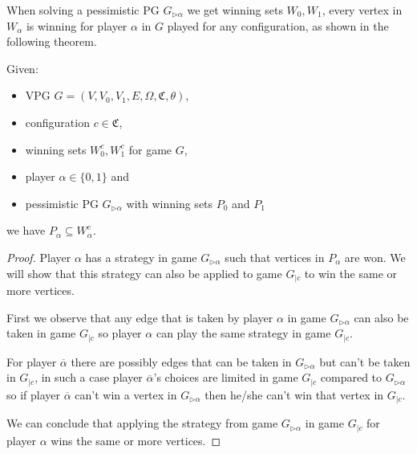 When solving a pessimistic PG $G_{\triangleright\alpha}$ we get winning sets $W_0,W_1$, every vertex in $W_\alpha$ is winning for player $\alpha$ in $G$ played for any configuration, as shown in the following theorem.
\begin{theorem}
	\label{the_pess_is_winning_for_all_conf}
	Given:
	\begin{itemize}
		\item VPG $G = (V,V_0,V_1,E,\Omega,\mathfrak{C},\theta)$,
		\item configuration $c \in \mathfrak{C}$,
		\item winning sets $W_0^c, W_1^c$ for game $G$,
		\item player $\alpha \in \{0,1\}$ and
		\item pessimistic PG $G_{\triangleright\alpha}$ with winning sets $P_0$ and $P_1$
	\end{itemize}
we have $P_\alpha \subseteq W_\alpha^c$.
	\begin{proof}
		Player $\alpha$ has a strategy in game $G_{\triangleright\alpha}$ such that vertices in $P_\alpha$ are won. We will show that this strategy can also be applied to game $G_{|c}$ to win the same or more vertices.
		
		First we observe that any edge that is taken by player $\alpha$ in game $G_{\triangleright\alpha}$ can also be taken in game $G_{|c}$ so player $\alpha$ can play the same strategy in game $G_{|c}$.
		
		For player $\overline{\alpha}$ there are possibly edges that can be taken in $G_{\triangleright\alpha}$ but can't be taken in $G_{|c}$, in such a case player $\overline{\alpha}$'s choices are limited in game $G_{|c}$ compared to $G_{\triangleright\alpha}$ so if player $\overline{\alpha}$ can't win a vertex in $G_{\triangleright\alpha}$ then he/she can't win that vertex in $G_{|c}$.
		
		We can conclude that applying the strategy from game $G_{\triangleright\alpha}$ in game $G_{|c}$ for player $\alpha$ wins the same or more vertices.
	\end{proof}
\end{theorem}

